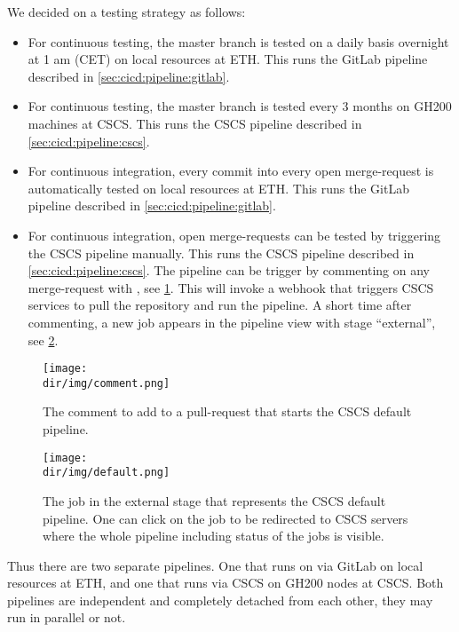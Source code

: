 We decided on a testing strategy as follows:
\begin{itemize}
    \item For continuous testing, the master branch is tested on a daily basis overnight at 1 am (CET) on local resources at ETH. This runs the GitLab pipeline described in \cref{sec:cicd:pipeline:gitlab}.
    \item For continuous testing, the master branch is tested every 3 months on GH200 machines at CSCS. This runs the CSCS pipeline described in \cref{sec:cicd:pipeline:cscs}.
    \item For continuous integration, every commit into every open merge-request is automatically tested on local resources at ETH. This runs the GitLab pipeline described in \cref{sec:cicd:pipeline:gitlab}.
    \item{For continuous integration, open merge-requests can be tested by triggering the CSCS pipeline manually. This runs the CSCS pipeline described in \cref{sec:cicd:pipeline:cscs}. The pipeline can be trigger by commenting on any merge-request with , see \cref{fig:cicd:comment}. This will invoke a webhook that triggers CSCS services to pull the repository and run the pipeline. A short time after commenting, a new job appears in the pipeline view with stage ``external'', see \cref{fig:cicd:external}.}
\end{itemize}

\begin{figure}
    \centering
    \texttt{[image: \\dir/img/comment.png]}
    \caption{The comment to add to a pull-request that starts the CSCS default pipeline.}
    \label{fig:cicd:comment}
\end{figure}

\begin{figure}
    \centering
    \texttt{[image: \\dir/img/default.png]}
    \caption{The job in the external stage that represents the CSCS default pipeline. One can click on the job to be redirected to CSCS servers where the whole pipeline including status of the jobs is visible.}
    \label{fig:cicd:external}
\end{figure}

Thus there are two separate pipelines.
One that runs on via GitLab on local resources at ETH, and one that runs via CSCS on GH200 nodes at CSCS.
Both pipelines are independent and completely detached from each other, they may run in parallel or not.

